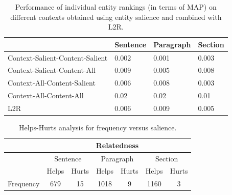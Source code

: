 \begin{table}[t]
\caption{Performance of individual entity rankings (in terms of MAP) on different contexts obtained using entity salience and combined with L2R.}
\label{tab:Results-Entity-Rankings-Sal}
\begin{tabular}{@{}llll@{}}
\toprule
                                & Sentence & Paragraph & Section \\ \midrule
Context-Salient-Content-Salient & 0.002    & 0.001     & 0.003   \\
Context-Salient-Content-All     & 0.009    & 0.005     & 0.008   \\
Context-All-Content-Salient     & 0.006    & 0.008     & 0.003   \\
Context-All-Content-All         & 0.02     & 0.02      & 0.01    \\ \midrule
L2R                             & 0.006    & 0.009     & 0.005   \\ \bottomrule
\end{tabular}
\end{table}

\begin{table}[t]
\caption{Helps-Hurts analysis for frequency versus salience.}
\label{tab:Helps-Hurts-Analysis}
\begin{tabular}{|l|c|c|c|c|c|c|}
\hline
                                & \multicolumn{6}{c|}{Relatedness}                                                              \\ \hline
                                & \multicolumn{2}{c|}{Sentence} & \multicolumn{2}{c|}{Paragraph} & \multicolumn{2}{c|}{Section} \\ \hline
                                & Helps         & Hurts         & Helps          & Hurts         & Helps         & Hurts        \\ \hline
\multicolumn{1}{|c|}{Frequency} & 679           & 15            & 1018           & 9             & 1160          & 3            \\ \hline
\end{tabular}
\end{table}

